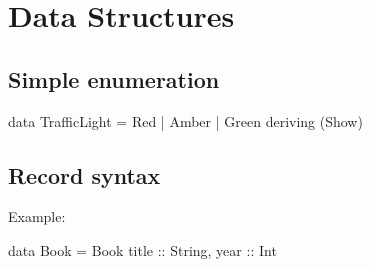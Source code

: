 \section{Data Structures}

\subsection{Simple enumeration}

\begin{haskellcode}
data TrafficLight = Red | Amber | Green deriving (Show)
\end{haskellcode}

\subsection{Record syntax}

Example:

\begin{haskellcode}
data Book = Book { title :: String, year :: Int }
\end{haskellcode}

